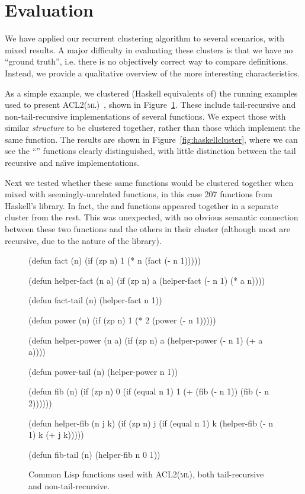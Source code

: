 \section{Evaluation}
\label{sec:evaluation}

We have applied our recurrent clustering algorithm to several scenarios, with
mixed results. A major difficulty in evaluating these clusters is that we have
no ``ground truth'', i.e. there is no objectively correct way to compare
definitions. Instead, we provide a qualitative overview of the more interesting
characteristics.

As a simple example, we clustered (Haskell equivalents of) the running examples
used to present \textsc{ACL2(ml)}~\cite{heras2013proof}, shown in
Figure~\ref{fig:lisp}. These include tail-recursive and non-tail-recursive
implementations of several functions. We expect those with similar
\emph{structure} to be clustered together, rather than those which implement the
same function. The results are shown in Figure~\ref{fig:haskellcluster}, where
we can see the ``'' functions clearly distinguished, with little
distinction between the tail recursive and na\"{\i}ve implementations.

Next we tested whether these same functions would be clustered together when
mixed with seemingly-unrelated functions, in this case 207 functions from
Haskell's  library. In fact, the  and 
functions appeared together in a separate cluster from the rest. This was
unexpected, with no obvious semantic connection between these two functions and
the others in their cluster (although most are recursive, due to the nature of
the  library).

\begin{figure}
  \begin{common-lisp}
(defun fact (n)
  (if (zp n) 1 (* n (fact (- n 1)))))

(defun helper-fact (n a)
  (if (zp n) a (helper-fact (- n 1) (* a n))))

(defun fact-tail (n)
  (helper-fact n 1))

(defun power (n)
  (if (zp n) 1 (* 2 (power (- n 1)))))

(defun helper-power (n a)
  (if (zp n) a (helper-power (- n 1) (+ a a))))

(defun power-tail (n)
  (helper-power n 1))

(defun fib (n)
  (if (zp n)
      0
      (if (equal n 1)
          1
          (+ (fib (- n 1)) (fib (- n 2))))))

(defun helper-fib (n j k)
  (if (zp n)
      j
      (if (equal n 1)
          k
          (helper-fib (- n 1) k (+ j k)))))

(defun fib-tail (n)
  (helper-fib n 0 1))
  \end{common-lisp}
  \caption{Common Lisp functions used with \textsc{ACL2(ml)}, both
    tail-recursive and non-tail-recursive.}
  \label{fig:lisp}
\end{figure}

